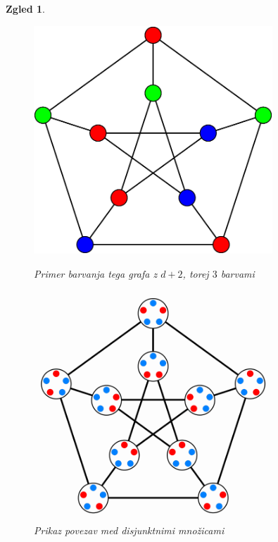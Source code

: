 \documentclass[a4paper,12pt]{article}
\newtheorem{zgled}{Zgled}
\begin{document}
\begin{zgled}
{\begin{figure}[h!]
	\centering
	\begin{minipage}{0.45\textwidth}
		\centering
		\includegraphics[width=0.8\textwidth]{petersenov_graf_barvanje} %
        	\caption{Primer barvanja tega grafa z $d+2$, torej $3$ barvami}
    	\end{minipage}\hfill
    	\begin{minipage}{0.45\textwidth}
       	 \centering
        	 \includegraphics[width=0.8\textwidth]{petersenov_graf_mnozice} %
       	 \caption{Prikaz povezav med disjunktnimi množicami}
    	\end{minipage}
\end{figure}
}

\end{zgled}
\end{document}
